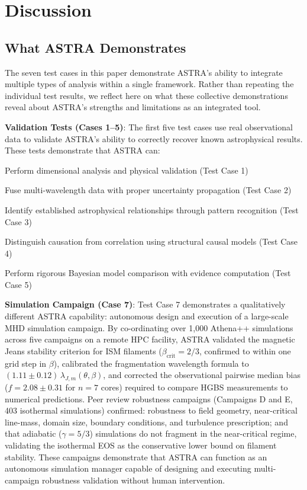 \documentclass[usenatbib]{rasti}
\begin{document}
\section{Discussion}

\subsection{What ASTRA Demonstrates}

The seven test cases in this paper demonstrate ASTRA's ability to integrate multiple types of analysis within a single framework. Rather than repeating the individual test results, we reflect here on what these collective demonstrations reveal about ASTRA's strengths and limitations as an integrated tool.

\textbf{Validation Tests (Cases 1--5)}: The first five test cases use real observational data to validate ASTRA's ability to correctly recover known astrophysical results. These tests demonstrate that ASTRA can:
\begin{description}
\item Perform dimensional analysis and physical validation (Test Case 1)
\item Fuse multi-wavelength data with proper uncertainty propagation (Test Case 2)
\item Identify established astrophysical relationships through pattern recognition (Test Case 3)
\item Distinguish causation from correlation using structural causal models (Test Case 4)
\item Perform rigorous Bayesian model comparison with evidence computation (Test Case 5)
\end{description}

\textbf{Simulation Campaign (Case 7)}: Test Case 7 demonstrates a qualitatively different
ASTRA capability: autonomous design and execution of a large-scale MHD simulation campaign.
By co-ordinating over 1,000 Athena++ simulations across five campaigns on a remote HPC
facility, ASTRA validated the magnetic Jeans stability criterion for ISM filaments
($\beta_\mathrm{crit} = 2/3$, confirmed to within one grid step in $\beta$), calibrated the
fragmentation wavelength formula to $(1.11 \pm 0.12)\,\lambda_{J,m}(\theta,\beta)$, and
corrected the observational pairwise median bias ($f=2.08 \pm 0.31$ for $n=7$ cores) required
to compare HGBS measurements to numerical predictions. Peer review robustness campaigns
(Campaigns D and E, 403 isothermal simulations) confirmed: robustness to field geometry,
near-critical line-mass, domain size, boundary conditions, and turbulence prescription; and
that adiabatic ($\gamma = 5/3$) simulations do not fragment in the near-critical regime,
validating the isothermal EOS as the conservative lower bound on filament stability.
These campaigns demonstrate that ASTRA can function as an autonomous simulation manager
capable of designing and executing multi-campaign robustness validation without human
intervention.
\end{document}
